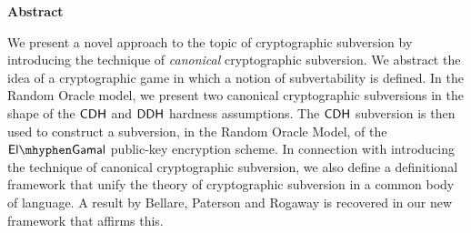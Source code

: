 
\begin{center}
  \large\textbf{Abstract}
\end{center}

We present a novel approach to the topic of cryptographic subversion by introducing the technique of \emph{canonical} cryptographic subversion. We abstract the idea of a cryptographic game in which a notion of subvertability is defined. In the Random Oracle model, we present two canonical cryptographic subversions in the shape of the $\mathsf{CDH}$ and $\mathsf{DDH}$ hardness assumptions. The $\mathsf{CDH}$ subversion is then used to construct a subversion, in the Random Oracle Model, of the $\elGamal$ public-key encryption scheme. In connection with introducing the technique of canonical cryptographic subversion, we also define a definitional framework that unify the theory of cryptographic subversion in a common body of language. A result by Bellare, Paterson and Rogaway is recovered in our new framework that affirms this. 

\cleardoublepage
